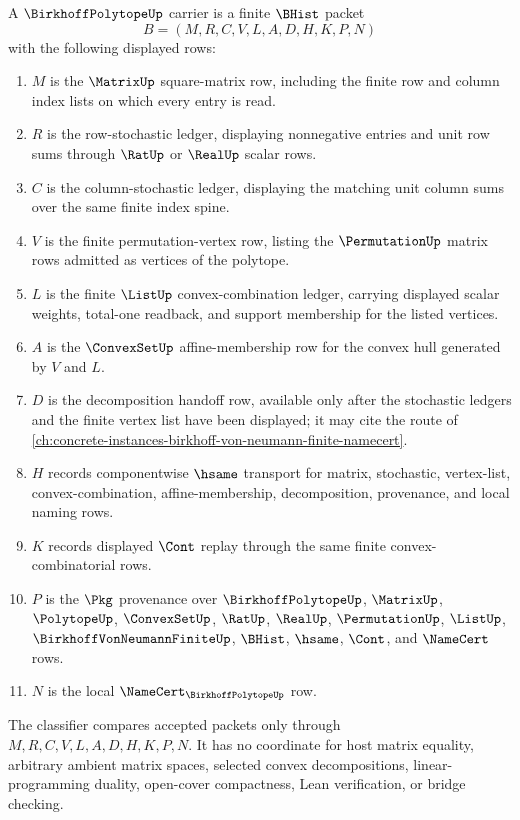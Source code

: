 \begin{definition}
\label{def:birkhoff-polytope-carrier}
A $\BirkhoffPolytopeUp$ carrier is a finite $\BHist$ packet
$$
B=(M,R,C,V,L,A,D,H,K,P,N)
$$
with the following displayed rows:
\begin{enumerate}
\item $M$ is the $\MatrixUp$ square-matrix row, including the finite row and column index lists on which every entry is read.
\item $R$ is the row-stochastic ledger, displaying nonnegative entries and unit row sums through $\RatUp$ or $\RealUp$ scalar rows.
\item $C$ is the column-stochastic ledger, displaying the matching unit column sums over the same finite index spine.
\item $V$ is the finite permutation-vertex row, listing the $\PermutationUp$ matrix rows admitted as vertices of the polytope.
\item $L$ is the finite $\ListUp$ convex-combination ledger, carrying displayed scalar weights, total-one readback, and support membership for the listed vertices.
\item $A$ is the $\ConvexSetUp$ affine-membership row for the convex hull generated by $V$ and $L$.
\item $D$ is the decomposition handoff row, available only after the stochastic ledgers and the finite vertex list have been displayed; it may cite the route of \autoref{ch:concrete-instances-birkhoff-von-neumann-finite-namecert}.
\item $H$ records componentwise $\hsame$ transport for matrix, stochastic, vertex-list, convex-combination, affine-membership, decomposition, provenance, and local naming rows.
\item $K$ records displayed $\Cont$ replay through the same finite convex-combinatorial rows.
\item $P$ is the $\Pkg$ provenance over $\BirkhoffPolytopeUp$, $\MatrixUp$, $\PolytopeUp$, $\ConvexSetUp$, $\RatUp$, $\RealUp$, $\PermutationUp$, $\ListUp$, $\BirkhoffVonNeumannFiniteUp$, $\BHist$, $\hsame$, $\Cont$, and $\NameCert$ rows.
\item $N$ is the local $\NameCert_{\BirkhoffPolytopeUp}$ row.
\end{enumerate}
The classifier compares accepted packets only through $M,R,C,V,L,A,D,H,K,P,N$. It has no coordinate for host matrix equality, arbitrary ambient matrix spaces, selected convex decompositions, linear-programming duality, open-cover compactness, Lean verification, or bridge checking.
\end{definition}

